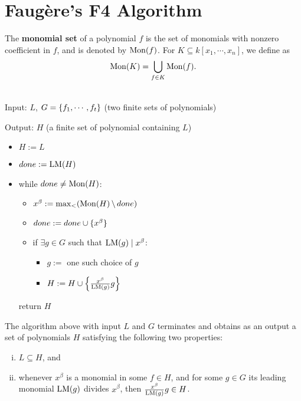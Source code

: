 \chapter{Faug\`ere's F4 Algorithm}

\begin{definition}
    \label{def:MonomialSet}
    \leanok
    The \textbf{monomial set} of a polynomial \(f\) is the set of monomials with
    nonzero coefficient in \(f\), and is denoted by \(\mathrm{Mon}(f)\). For \(K
    \subseteq k[x_1, \cdots, x_n]\), we define as
    \[\mathrm{Mon}(K) = \bigcup_{f \in K} \mathrm{Mon}(f).\]
\end{definition}

\begin{definition}
    \label{def:SymbolicPreprocessing}
    \leanok
    ~\\
    
    Input: \(L\), \(G = \{ f_1, \cdots, f_t \}\)
    (two finite sets of polynomials)

    Output: \(H\) (a finite set of polynomial containing \(L\))

    \begin{itemize}
        \item[] \(H := L\)
        \item[] \(done := \mathrm{LM}(H)\)
        \item[] while \(done \ne \mathrm{Mon}(H)\):
            \begin{itemize}
                \item[] \(x^\beta := \max_{<} (\mathrm{Mon}(H) \,\backslash\, done)\)
                \item[] \(done := done \cup \{ x^\beta \}\)
                \item[] if \(\exists g \in G\) such that \(\mathrm{LM}(g) \mid x^\beta\):
                    \begin{itemize}
                        \item[] \(g :=\) one such choice of \(g\)
                        \item[] \(H := H \cup \left\{ \frac{x^\beta}{\mathrm{LM}(g)} g \right\}\)
                    \end{itemize}
            \end{itemize}
        return \(H\)
    \end{itemize}

    The algorithm above with input \(L\) and \(G\) terminates and obtains as an
    output a set of polynomials \(H\) satisfying the following two properties:
    \begin{enumerate}[(i)]
        \item \(L \subseteq H\), and
        \item whenever \(x^\beta\) is a monomial in some \(f \in H\), and for
        some \(g \in G\) its leading monomial \(\mathrm{LM}(g)\) divides
        \(x^\beta\), then \(\frac{x^\beta}{\mathrm{LM}(g)} g \in H\).
    \end{enumerate}
\end{definition}
